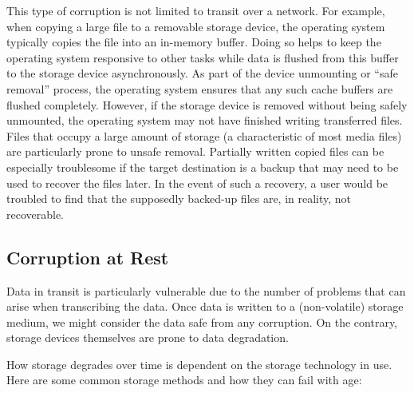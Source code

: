 This type of corruption is not limited to transit over a network. For example, when copying a large file to a removable storage device, the operating system typically copies the file into an in-memory buffer. Doing so helps to keep the operating system responsive to other tasks while data is flushed from this buffer to the storage device asynchronously. As part of the device unmounting or ``safe removal'' process, the operating system ensures that any such cache buffers are flushed completely. However, if the storage device is removed without being safely unmounted, the operating system may not have finished writing transferred files. Files that occupy a large amount of storage (a characteristic of most media files) are particularly prone to unsafe removal. Partially written copied files can be especially troublesome if the target destination is a backup that may need to be used to recover the files later. In the event of such a recovery, a user would be troubled to find that the supposedly backed-up files are, in reality, not recoverable.

\subsection{Corruption at Rest}

Data in transit is particularly vulnerable due to the number of problems that can arise when transcribing the data. Once data is written to a (non-volatile) storage medium, we might consider the data safe from any corruption. On the contrary, storage devices themselves are prone to data degradation.

How storage degrades over time is dependent on the storage technology in use. Here are some common storage methods and how they can fail with age:

